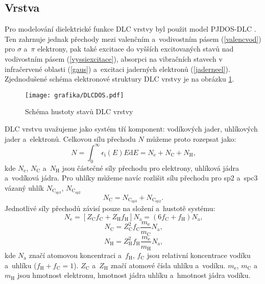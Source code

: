 \subsection{Vrstva}
Pro modelování dielektrické funkce DLC vrstvy byl použit model PJDOS-DLC \cite{franta2007}. Ten zahrnuje jednak přechody mezi valenčním a~vodivostním pásem (\ref{valencvod}) pro $\sigma$ a~$\pi$ elektrony, pak také excitace do vyšších excitovaných stavů nad vodivostním pásem (\ref{vyssiexcitace}), absorpci na vibračních stavech v infračervené oblasti (\ref{gaus}) a~excitaci jaderných elektronů (\ref{jaderneel}). Zjednodušené schéma elektronové struktury DLC vrstvy je na obrázku \ref{DLCDOS}.

\begin{figure}[h]
\centering
\texttt{[image: grafika/DLCDOS.pdf]}
\caption{Schéma hustoty stavů DLC vrstvy}
\label{DLCDOS}
\end{figure} 

DLC vrstvu uvažujeme jako systém tří komponent: vodíkových jader, uhlíkových jader a~elektronů. Celkovou sílu přechodu $N$ můžeme proto rozepsat jako:
\begin{equation}
N = \int_0^\infty \epsilon_\mathrm{i}(E) E \mathrm{d}E = N_\mathrm{e} + N_\mathrm{C} + N_\mathrm{H} \text{,}
\end{equation} 
kde $N_\mathrm{e}$, $N_\mathrm{C}$ a~$N_\mathrm{H}$ jsou částečné síly přechodu pro elektrony, uhlíková jádra a~vodíková jádra. Pro uhlíky můžeme navíc rozlišit sílu přechodu pro sp2 a~spc3 vázaný uhlík $N_\mathrm{C_{sp3}}$, $N_\mathrm{C_{sp2}}$
\begin{equation}
N_\mathrm{C} = N_\mathrm{C_{sp3}} + N_\mathrm{C_{sp2}} \text{.}
\end{equation} 
Jednotlivé síly přechodů závisí pouze na složení a~hustotě systému:
\begin{equation}
N_\mathrm{e} = [Z_\mathrm{C}f_\mathrm{C} + Z_\mathrm{H} f_\mathrm{H}] N_\mathrm{a} = (6f_\mathrm{C} + f_\mathrm{H})N_\mathrm{a} \text{,}
\end{equation}
\begin{equation}
N_\mathrm{C} = Z^2_\mathrm{C} f_\mathrm{C} \frac{m_\mathrm{e}}{m_\mathrm{C}} N_\mathrm{a} \text{,}
\end{equation}
\begin{equation}
N_\mathrm{H} = Z^2_\mathrm{H} f_\mathrm{H} \frac{m_\mathrm{e}}{m_\mathrm{H}} N_\mathrm{a} \text{,}
\end{equation}
kde $N_\mathrm{a}$ značí atomovou koncentraci a~$f_\mathrm{H}$, $f_\mathrm{C}$ jsou relativní koncentrace vodíku a~uhlíku ($f_\mathrm{H} + f_\mathrm{C} = 1 $). $Z_\mathrm{C}$ a~$Z_\mathrm{H}$ značí atomové čísla uhlíku a~vodíku. $m_\mathrm{e}$, $m_\mathrm{C}$ a~$m_\mathrm{H}$ jsou hmotnost elektronu, hmotnost jádra uhlíku a~hmotnost jádra vodíku. 

